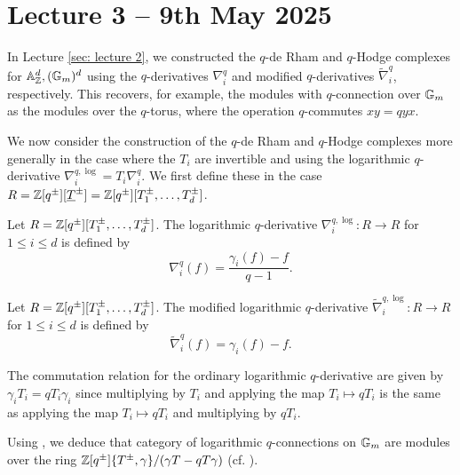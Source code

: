 \section{Lecture 3 -- 9th May 2025}\label{sec: lecture 3}
In Lecture \ref{sec: lecture 2}, we constructed the $q$-de Rham and $q$-Hodge complexes for $\mathbb{A}^{d}_{\mathbb{Z}},(\mathbb{G}_{m})^{d}$ using the $q$-derivatives $\nabla_{i}^{q}$ and modified $q$-derivatives $\widetilde{\nabla}_{i}^{q}$, respectively. This recovers, for example, the modules with $q$-connection over $\mathbb{G}_{m}$ as the modules over the $q$-torus, where the operation $q$-commutes $xy=qyx$. 

We now consider the construction of the $q$-de Rham and $q$-Hodge complexes more generally in the case where the $T_{i}$ are invertible and using the logarithmic $q$-derivative $\nabla_{i}^{q,\log}=T_{i}\nabla_{i}^{q}$. We first define these in the case $R=\mathbb{Z}[q^{\pm}][\underline{T}^{\pm}]=\mathbb{Z}[q^{\pm}][T_{1}^{\pm},\dots,T_{d}^{\pm}]$. 
\begin{definition}\label{def: logarithmic q-derivative}
    Let $R=\mathbb{Z}[q^{\pm}][T_{1}^{\pm},\dots,T_{d}^{\pm}]$. The logarithmic $q$-derivative $\nabla_{i}^{q,\log}:R\to R$ for $1\leq i\leq d$ is defined by 
    $$\nabla_{i}^{q}(f)=\frac{\gamma_{i}(f)-f}{q-1}.$$
\end{definition}
\begin{definition}\label{def: modified logarithmic q-derivative}
    Let $R=\mathbb{Z}[q^{\pm}][T_{1}^{\pm},\dots,T_{d}^{\pm}]$. The modified logarithmic $q$-derivative $\widetilde{\nabla}_{i}^{q,\log}:R\to R$ for $1\leq i\leq d$ is defined by 
    $$\widetilde{\nabla}_{i}^{q}(f)=\gamma_{i}(f)-f.$$
\end{definition}
\begin{remark}\label{rmk: commutation for log q-connections}
    The commutation relation for the ordinary logarithmic $q$-derivative are given by $\gamma_{i}T_{i}=qT_{i}\gamma_{i}$ since multiplying by $T_{i}$ and applying the map $T_{i}\mapsto qT_{i}$ is the same as applying the map $T_{i}\mapsto qT_{i}$ and multiplying by $qT_{i}$. 
\end{remark}
\begin{example}
    Using , we deduce that category of logarithmic $q$-connections on $\mathbb{G}_{m}$ are modules over the ring $\mathbb{Z}[q^{\pm}]\{T^{\pm},\gamma\}/(\gamma T-q T\gamma)$ (cf. ). 
\end{example}

